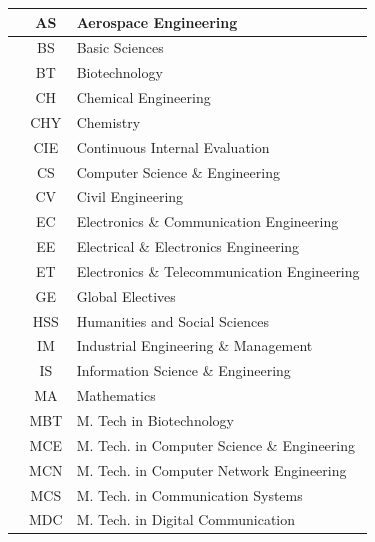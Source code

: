 \begin{longtable}{|c|c|p{12cm}|}
	\stepcounter{rowcount}\therowcount  & AS & Aerospace Engineering \\ \hline
	\stepcounter{rowcount}\therowcount  & BS & Basic Sciences \\ \hline
	\stepcounter{rowcount}\therowcount  & BT & Biotechnology \\ \hline
	\stepcounter{rowcount}\therowcount  & CH & Chemical Engineering \\ \hline
	\stepcounter{rowcount}\therowcount  & CHY & Chemistry \\ \hline
	\stepcounter{rowcount}\therowcount  & CIE & Continuous Internal Evaluation \\ \hline
	\stepcounter{rowcount}\therowcount  & CS & Computer Science \& Engineering \\ \hline
	\stepcounter{rowcount}\therowcount  & CV & Civil Engineering \\ \hline
	\stepcounter{rowcount}\therowcount  & EC & Electronics \& Communication Engineering \\ \hline
	\stepcounter{rowcount}\therowcount  & EE & Electrical \& Electronics Engineering \\ \hline 
	\stepcounter{rowcount}\therowcount  & ET & Electronics \& Telecommunication Engineering \\ \hline
	\stepcounter{rowcount}\therowcount  & GE & Global Electives \\ \hline
	\stepcounter{rowcount}\therowcount  & HSS & Humanities and Social Sciences \\ \hline
	\stepcounter{rowcount}\therowcount  & IM & Industrial Engineering \& Management \\ \hline
	\stepcounter{rowcount}\therowcount  & IS & Information Science \& Engineering \\ \hline
	\stepcounter{rowcount}\therowcount  & MA & Mathematics \\ \hline
	\stepcounter{rowcount}\therowcount  & MBT & M. Tech in Biotechnology \\ \hline
	\stepcounter{rowcount}\therowcount  & MCE & M. Tech. in Computer Science \& Engineering \\ \hline
	\stepcounter{rowcount}\therowcount  & MCN & M. Tech. in Computer Network Engineering \\ \hline
	\stepcounter{rowcount}\therowcount  & MCS & M. Tech. in Communication Systems \\ \hline
	\stepcounter{rowcount}\therowcount  & MDC & M. Tech. in Digital Communication \\ \hline

\end{longtable}
